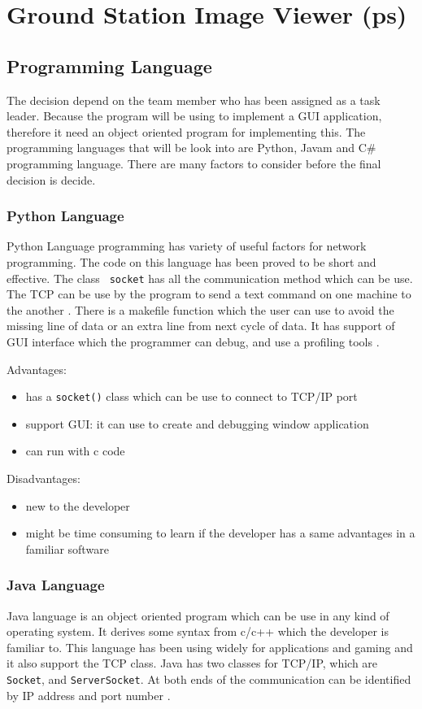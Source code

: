 \section{Ground Station Image Viewer (ps)}

\subsection{Programming Language}

The decision depend on the team member who has been assigned as a task leader.
Because the program will be using to implement a GUI application, therefore it need an object oriented program for implementing this.
The programming languages that will be look into are Python, Javam and C\# programming language.
There are many factors to consider before the final decision is decide.

\subsubsection*{Python Language}
Python Language programming has variety of useful factors for network programming. 
The code on this language has been proved to be short and effective.
The class \texttt{ socket} has all the communication method which can be use. 
The TCP can be use by the program to send a text command on one machine to the another \cite{normanM}. 
There is a makefile function which the user can use to avoid the missing line of data or an extra line from next cycle of data\cite{normanM,guidoR}. 
It has support of GUI interface which the programmer can debug, and use a profiling tools \cite{sannerM}. 

Advantages:
\begin{itemize}
\item has a \texttt{socket()} class which can be use to connect to TCP/IP port
\item support GUI: it can use to create and debugging window application
\item can run with c code
\end{itemize}

Disadvantages:
\begin{itemize}
\item new to the developer
\item might be time consuming to learn if the developer has a same advantages in a familiar software
\end{itemize}

\subsubsection*{Java Language}
Java language is an object oriented program which can be use in any kind of operating system.
It derives some syntax from c/c++ which the developer is familiar to. 
This language has been using widely for applications and gaming and it also support the TCP class.
Java has two classes for TCP/IP, which are \texttt{Socket}, and \texttt{ServerSocket}.
At both ends of the communication can be identified by IP address and port number \cite{kennethC}.


